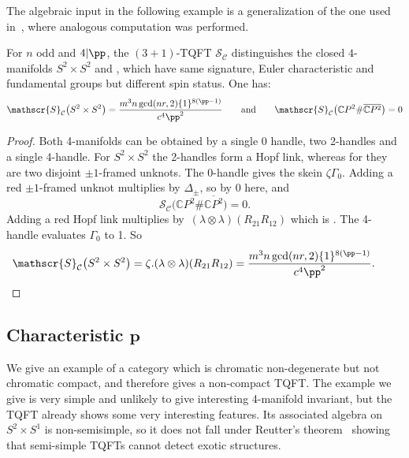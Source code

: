 \documentclass[pdftex]{sigma}
\numberwithin{equation}{section}
\numberwithin{theorem}{section}
\numberwithin{proposition}{section}
\numberwithin{definition}{section}
\numberwithin{lemma}{section}
\numberwithin{corollary}{section}
\numberwithin{remark}{section}
\numberwithin{example}{section}
\newcommand{\cat}{\mathcal{C}}
\newcommand{\C}{\ensuremath{\mathbb{C}}}
\newcommand{\TSkein}{{\mathscr{S}}}
\newcounter{exo} \newcounter{numexercice}
\begin{document}
The algebraic input in the following example is
a generalization of the one used in~\cite{BD22}, where analogous
computation was performed.
\begin{proposition}
 For $n$ odd and $4\vert {\pp}$, the $(3+1)$-TQFT $\TSkein_\cat$
 distinguishes the closed $4$-manifolds $S^2\times S^2$ and
 \smash{$\C P^2\#\overline{\C P^2}$}, which have same signature, Euler
 characteristic and fundamental groups but different spin status. One
 has: %
 \[\TSkein_\cat\bigl(S^2\times S^2\bigr)= \frac{m^3n \gcd(nr,2)\{1\}^{8({\pp}-1)}}{c^4{\pp}^2}
 \qquad\text{and}\qquad \TSkein_\cat\bigl(\C P^2\#\overline{\C P^2}\bigr)=0\]
\end{proposition}
\begin{proof}
 Both 4-manifolds can be obtained by a single 0 handle, two 2-handles
 and a single 4-handle. For $S^2\times S^2$ the 2-handles form a Hopf
 link, whereas for \smash{$\C P^2\#\overline{\C P^2}$} they are two disjoint
 $\pm1$-framed unknots. The 0-handle gives the skein
 $\zeta \Gamma_0$. Adding a red $\pm1$-framed unknot multiplies by
 $\Delta_\pm$, so by 0 here, and
\[
\TSkein_\cat\bigl(\C P^2\#\overline{\C P^2}\bigr)=0.
\]
 Adding a red Hopf link
 multiplies by~$(\lambda \otimes \lambda)(R_{21}R_{12})$ which is
. The 4-handle
 evaluates $\Gamma_0$ to 1. So
 \[
 \TSkein_\cat\bigl(S^2\times S^2\bigr)= \zeta. (\lambda \otimes
 \lambda)(R_{21}R_{12}) = \frac{m^3n\gcd(nr,2)\{1\}^{8({\pp}-1)}}{c^4{\pp}^2}.
\tag*{\qed}
\]
\renewcommand{\qed}{}
\end{proof}

\subsection[Characteristic p]{Characteristic $\boldsymbol{p}$}\label{SS:Ex-chp}
We give an example of a category which is chromatic non-degenerate but
not chromatic compact, and therefore gives a non-compact TQFT. The
example we give is very simple and unlikely to give interesting
4-manifold invariant, but the TQFT already shows some very interesting
features. Its associated algebra on $S^2\times S^1$ is non-semisimple,
so it does not fall under Reutter's theorem~\cite{Reutter} showing
that semi-simple TQFTs cannot detect exotic structures.
\end{document}
